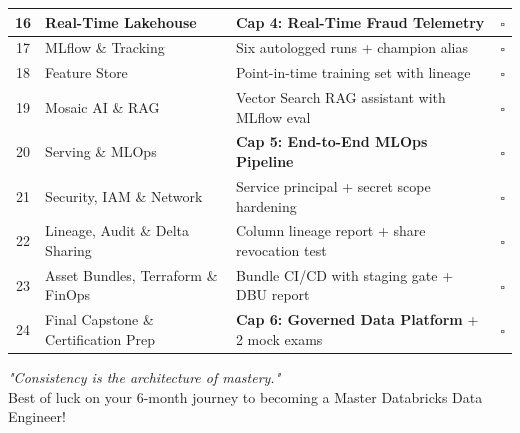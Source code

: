 \documentclass[11pt, a4paper]{article}
\begin{document}
\begin{center}
\begin{longtable}{@{} c l p{7cm} c @{}}
16 & Real-Time Lakehouse & \textbf{Cap 4: Real-Time Fraud Telemetry} & $\square$ \\
\midrule
17 & MLflow \& Tracking & Six autologged runs + champion alias & $\square$ \\
18 & Feature Store & Point-in-time training set with lineage & $\square$ \\
19 & Mosaic AI \& RAG & Vector Search RAG assistant with MLflow eval & $\square$ \\
20 & Serving \& MLOps & \textbf{Cap 5: End-to-End MLOps Pipeline} & $\square$ \\
\midrule
21 & Security, IAM \& Network & Service principal + secret scope hardening & $\square$ \\
22 & Lineage, Audit \& Delta Sharing & Column lineage report + share revocation test & $\square$ \\
23 & Asset Bundles, Terraform \& FinOps & Bundle CI/CD with staging gate + DBU report & $\square$ \\
24 & Final Capstone \& Certification Prep & \textbf{Cap 6: Governed Data Platform} + 2 mock exams & $\square$ \\

\end{longtable}
\end{center}

\vspace{1cm}
\begin{center}
    \textit{"Consistency is the architecture of mastery."} \\
    Best of luck on your 6-month journey to becoming a Master Databricks Data Engineer!
\end{center}
\end{document}
